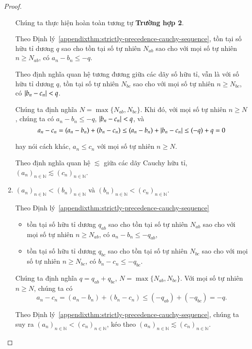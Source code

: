 \begin{proof}
\begin{enumerate}[label={\textbf{Trường hợp \arabic*.}},itemindent=2cm]
              Chúng ta thực hiện hoàn toàn tương tự \textbf{Trường hợp 2}.

              Theo Định lý~\ref{appendixthm:strictly-precedence-cauchy-sequence}, tồn tại số hữu tỉ dương $q$ sao cho tồn tại số tự nhiên $N_{ab}$ sao cho với mọi số tự nhiên $n\geq N_{ab}$, có $a_{n} - b_{n}\leq -q$.

              Theo định nghĩa quan hệ tương đương giữa các dãy số hữu tỉ, vẫn là với số hữu tỉ dương $q$, tồn tại số tự nhiên $N_{bc}$ sao cho với mọi số tự nhiên $n\geq N_{bc}$, có $\left\vert{b_{n} - c_{n}}\right\vert < q$.

              Chúng ta định nghĩa $N = \max\{ N_{ab}, N_{bc} \}$. Khi đó, với mọi số tự nhiên $n\geq N$, chúng ta có $a_{n} - b_{n}\leq -q$, $\left\vert{b_{n} - c_{n}}\right\vert < q$, và
              \[
                  a_{n} - c_{n} = (a_{n} - b_{n}) + (b_{n} - c_{n})\leq (a_{n} - b_{n}) + \left\vert{b_{n} - c_{n}}\right\vert\leq (-q) + q = 0
              \]

              hay nói cách khác, $a_{n}\leq c_{n}$ với mọi số tự nhiên $n\geq N$.

              Theo định nghĩa quan hệ $\lesssim$ giữa các dãy Cauchy hữu tỉ, ${(a_{n})}_{n\in\mathbb{N}}\lesssim {(c_{n})}_{n\in\mathbb{N}}$.
        \item ${(a_{n})}_{n\in\mathbb{N}} < {(b_{n})}_{n\in\mathbb{N}}$ và ${(b_{n})}_{n\in\mathbb{N}} < {(c_{n})}_{n\in\mathbb{N}}$.

              Theo Định lý~\ref{appendixthm:strictly-precedence-cauchy-sequence}
              \begin{itemize}
                  \item tồn tại số hữu tỉ dương $q_{ab}$ sao cho tồn tại số tự nhiên $N_{ab}$ sao cho với mọi số tự nhiên $n\geq N_{ab}$, có $a_{n} - b_{n}\leq -q_{ab}$,
                  \item tồn tại số hữu tỉ dương $q_{bc}$ sao cho tồn tại số tự nhiên $N_{bc}$ sao cho với mọi số tự nhiên $n\geq N_{bc}$, có $b_{n} - c_{n}\leq -q_{bc}$.
              \end{itemize}

              Chúng ta định nghĩa $q = q_{ab} + q_{bc}$, $N = \max\{ N_{ab}, N_{bc} \}$. Với mọi số tự nhiên $n\geq N$, chúng ta có
              \[
                  a_{n} - c_{n} = (a_{n} - b_{n}) + (b_{n} - c_{n}) \leq (-q_{ab}) + (-q_{bc}) = -q.
              \]

              Theo Định lý~\ref{appendixthm:strictly-precedence-cauchy-sequence}, chúng ta suy ra ${(a_{n})}_{n\in\mathbb{N}} < {(c_{n})}_{n\in\mathbb{N}}$, kéo theo ${(a_{n})}_{n\in\mathbb{N}}\lesssim {(c_{n})}_{n\in\mathbb{N}}$.
    \end{enumerate}


\end{proof}
